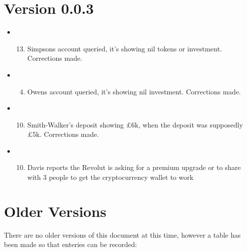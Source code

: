 \documentclass[letterpaper,10pt,openany,oneside,english]{sphinxmanual}
\begin{document}
\section{Version 0.0.3}
\label{\detokenize{releasenotes:version-0-0-3}}\begin{itemize}
\item {} \begin{enumerate}
\setcounter{enumi}{12}
\item {} 
Simpsons account queried, it’s showing nil tokens or investment.  Corrections made.

\end{enumerate}

\item {} \begin{enumerate}
\setcounter{enumi}{3}
\item {} 
Owens account queried, it’s showing nil investment.  Corrections made.

\end{enumerate}

\item {} \begin{enumerate}
\setcounter{enumi}{9}
\item {} 
Smith-Walker’s deposit showing £6k, when the deposit was supposedly £5k.  Corrections made.

\end{enumerate}

\item {} \begin{enumerate}
\setcounter{enumi}{9}
\item {} 
Davis reports the Revolut is asking for a premium upgrade or to share with 3 people to get the cryptocurrency wallet to work

\end{enumerate}

\end{itemize}


\section{Older Versions}
\label{\detokenize{releasenotes:older-versions}}
There are no older versions of this document at this time, however a table has been made so that enteries can be recorded:
\end{document}
